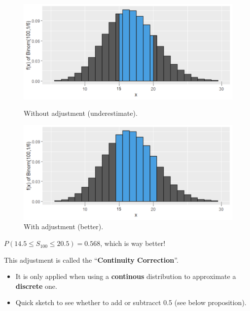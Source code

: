 \begin{remark}
\begin{figure}[!htb]
    \begin{minipage}{0.5\textwidth}
      \centering
      \includegraphics[width=1\linewidth]{img/without-adjustment.png}
      \caption{Without adjustment (underestimate).}
    \end{minipage}\hfill
    \begin{minipage}{0.5\textwidth}
      \centering
      \includegraphics[width=1\linewidth]{img/with-adjustment.png}
      \caption{With adjustment (better).}
    \end{minipage}
 \end{figure}

 $P(14.5 \leq S_{100} \leq 20.5) = 0.568$, which is way better!

 This adjustment is called the ``\textbf{Continuity Correction}''.
\end{remark}

\begin{note}
    \phantom{}
    \begin{itemize}
        \item It is only applied when using a \textbf{continous} distribution to approximate a \textbf{discrete} one.
        \item Quick sketch to see whether to add or subtracct 0.5 (see below proposition).
    \end{itemize}
\end{note}

